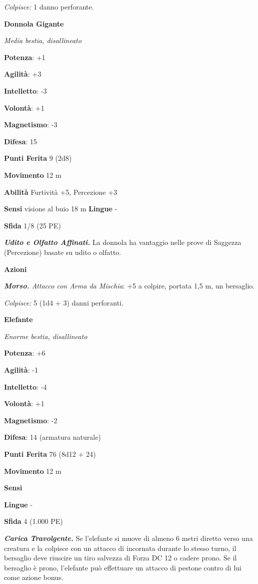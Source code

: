 \begin{multicols}{2}
\emph{Colpisce:} 1 danno perforante.

\textbf{Donnola Gigante}

\emph{Media bestia, disallineato}

\textbf{Potenza}: +1

\textbf{Agilità}: +3

\textbf{Intelletto}: -3

\textbf{Volontà}: +1

\textbf{Magnetismo}: -3

\textbf{Difesa}: 15

\textbf{Punti Ferita} 9 (2d8)

\textbf{Movimento} 12 m

\textbf{Abilità} Furtività +5, Percezione +3

\textbf{Sensi} visione al buio 18 m
\textbf{Lingue} -

\textbf{Sfida} 1/8 (25 PE)

\emph{\textbf{Udito e Olfatto Affinati.}} La donnola ha vantaggio nelle
prove di Saggezza (Percezione) basate su udito o olfatto.

\textbf{Azioni}

\emph{\textbf{Morso.} Attacco con Arma da Mischia}: +5 a colpire,
portata 1,5 m, un bersaglio.

\emph{Colpisce:} 5 (1d4 + 3) danni perforanti.

\textbf{Elefante}

\emph{Enorme bestia, disallineato}

\textbf{Potenza}: +6

\textbf{Agilità}: -1

\textbf{Intelletto}: -4

\textbf{Volontà}: +1

\textbf{Magnetismo}: -2

\textbf{Difesa}: 14 (armatura naturale)

\textbf{Punti Ferita} 76 (8d12 + 24)

\textbf{Movimento} 12 m

\textbf{Sensi} 

\textbf{Lingue} -

\textbf{Sfida} 4 (1.000 PE)

\emph{\textbf{Carica Travolgente.}} Se l'elefante si muove di almeno 6
metri diretto verso una creatura e la colpisce con un attacco di
incornata durante lo stesso turno, il bersaglio deve riuscire un tiro
salvezza di Forza DC 12 o cadere prono. Se il bersaglio è prono,
l'elefante può effettuare un attacco di pestone contro di lui come
azione bonus.


\end{multicols}
